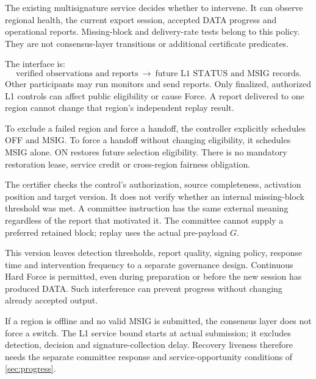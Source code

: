 The existing multisignature service decides whether to intervene.
It can observe regional health, the current export session, accepted
DATA progress and operational reports. Missing-block and delivery-rate
tests belong to this policy. They are not consensus-layer transitions
or additional certificate predicates.

The interface is:
\[
 \text{verified observations and reports}
 \ \longrightarrow\
 \text{future L1 STATUS and MSIG records}.
\]
Other participants may run monitors and send reports. Only finalized,
authorized L1 controls can affect public eligibility or cause Force.
A report delivered to one region cannot change that region's
independent replay result.

To exclude a failed region and force a handoff, the controller explicitly
schedules OFF and MSIG. To force a handoff without changing eligibility,
it schedules MSIG alone. ON restores future selection eligibility.
There is no mandatory restoration lease, service credit or cross-region
fairness obligation.

The certifier checks the control's authorization, source completeness,
activation position and target version. It does not verify whether an
internal missing-block threshold was met. A committee instruction has
the same external meaning regardless of the report that motivated it.
The committee cannot supply a preferred retained block; replay uses
the actual pre-payload $G$.

This version leaves detection thresholds, report quality, signing policy,
response time and intervention frequency to a separate governance design.
Continuous Hard Force is permitted, even during preparation or before
the new session has produced DATA. Such interference can prevent
progress without changing already accepted output.

If a region is offline and no valid MSIG is submitted, the consensus
layer does not force a switch. The L1 service bound starts at actual
submission; it excludes detection, decision and signature-collection
delay. Recovery liveness therefore needs the separate committee
response and service-opportunity conditions of \cref{sec:progress}.
